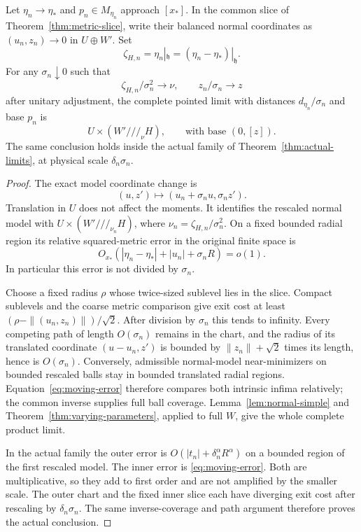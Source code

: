 \begin{theorem}\label{thm:moving-centers}
Let $\eta_n\to\eta_*$ and $p_n\in M_{\eta_n}$ approach $[x_*]$.
In the common slice of Theorem~\ref{thm:metric-slice}, write their
balanced normal coordinates as $(u_n,z_n)\to0$ in $U\oplus W'$.
Set
\[
 \zeta_{H,n}=\eta_n|_{\mathfrak h}
 =(\eta_n-\eta_*)|_{\mathfrak h}.
\]
For any $\sigma_n\downarrow0$ such that
\[
 \zeta_{H,n}/\sigma_n^2\to\nu,\qquad z_n/\sigma_n\to z
\]
after unitary adjustment, the complete pointed limit with distances
$d_{\eta_n}/\sigma_n$ and base $p_n$ is
\[
 U\times(W'///_\nu H),\qquad\text{with base }(0,[z]).
\]
The same conclusion holds inside the actual family of
Theorem~\ref{thm:actual-limits}, at physical scale $\delta_n\sigma_n$.
\end{theorem}
\begin{proof}
The exact model coordinate change is
\[
 (u,z')\longmapsto(u_n+\sigma_nu,\sigma_nz').
\]
Translation in $U$ does not affect the moments. It identifies the
rescaled normal model with $U\times(W'///_{\nu_n}H)$, where
$\nu_n=\zeta_{H,n}/\sigma_n^2$.
On a fixed bounded radial region its relative squared-metric error
in the original finite space is
\begin{equation}\label{eq:moving-error}
 O_{x_*}(|\eta_n-\eta_*|+|u_n|+\sigma_nR)=o(1).
\end{equation}
In particular this error is not divided by $\sigma_n$.

Choose a fixed radius $\rho$ whose twice-sized sublevel lies in
the slice. Compact sublevels and the coarse metric comparison give
exit cost at least $(\rho-\|(u_n,z_n)\|)/\sqrt2$.
After division by $\sigma_n$ this tends to infinity.
Every competing path of length $O(\sigma_n)$ remains in the chart,
and the radius of its translated coordinate $(u-u_n,z')$ is bounded
by $\|z_n\|+\sqrt2$ times its length, hence is $O(\sigma_n)$.
Conversely, admissible normal-model near-minimizers on bounded
rescaled balls stay in bounded translated radial regions.
Equation~\eqref{eq:moving-error} therefore compares both intrinsic
infima relatively; the common inverse supplies full ball coverage.
Lemma~\ref{lem:normal-simple} and
Theorem~\ref{thm:varying-parameters}, applied to full $W$, give the
whole complete product limit.

In the actual family the outer error is
$O(|t_n|+\delta_n^\alpha R^\alpha)$ on a bounded region of the
first rescaled model. The inner error is \eqref{eq:moving-error}.
Both are multiplicative, so they add to first order and are not
amplified by the smaller scale. The outer chart and the fixed inner
slice each have diverging exit cost after rescaling by
$\delta_n\sigma_n$. The same inverse-coverage and path argument
therefore proves the actual conclusion.
\end{proof}

